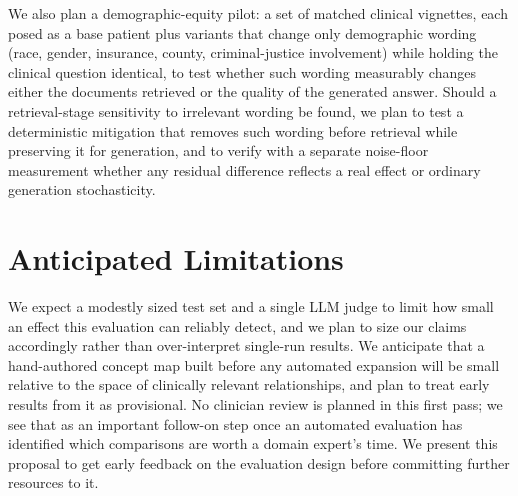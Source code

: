 \documentclass[letterpaper]{article}
\begin{document}
We also plan a demographic-equity pilot: a set of matched clinical vignettes, each posed as a base patient plus variants that change only demographic wording (race, gender, insurance, county, criminal-justice involvement) while holding the clinical question identical, to test whether such wording measurably changes either the documents retrieved or the quality of the generated answer. Should a retrieval-stage sensitivity to irrelevant wording be found, we plan to test a deterministic mitigation that removes such wording before retrieval while preserving it for generation, and to verify with a separate noise-floor measurement whether any residual difference reflects a real effect or ordinary generation stochasticity.

\section{Anticipated Limitations}

We expect a modestly sized test set and a single LLM judge to limit how small an effect this evaluation can reliably detect, and we plan to size our claims accordingly rather than over-interpret single-run results. We anticipate that a hand-authored concept map built before any automated expansion will be small relative to the space of clinically relevant relationships, and plan to treat early results from it as provisional. No clinician review is planned in this first pass; we see that as an important follow-on step once an automated evaluation has identified which comparisons are worth a domain expert's time. We present this proposal to get early feedback on the evaluation design before committing further resources to it.
\end{document}
